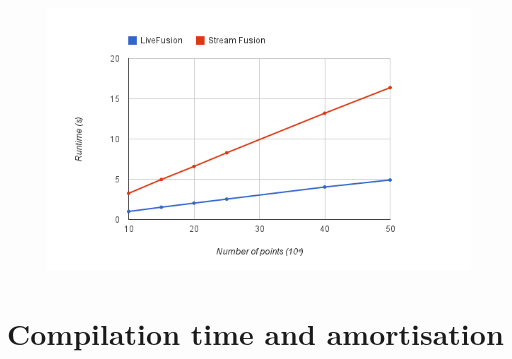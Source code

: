 \documentclass[preamble.tex]{subfiles}
\begin{document}
\begin{figure}
\includegraphics[center]{img/Eval-FarAndAboves-Overall}
\end{figure}

\clearpage
\section{Compilation time and amortisation}


\IfNotCompilingAll{}
\end{document}
